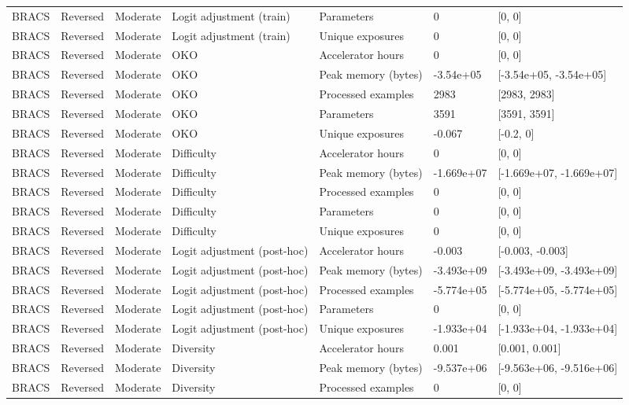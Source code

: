 \begin{longtable}{lllllll}
BRACS & Reversed & Moderate & Logit adjustment (train) & Parameters & 0 & [0, 0] \\
BRACS & Reversed & Moderate & Logit adjustment (train) & Unique exposures & 0 & [0, 0] \\
BRACS & Reversed & Moderate & OKO & Accelerator hours & 0 & [0, 0] \\
BRACS & Reversed & Moderate & OKO & Peak memory (bytes) & -3.54e+05 & [-3.54e+05, -3.54e+05] \\
BRACS & Reversed & Moderate & OKO & Processed examples & 2983 & [2983, 2983] \\
BRACS & Reversed & Moderate & OKO & Parameters & 3591 & [3591, 3591] \\
BRACS & Reversed & Moderate & OKO & Unique exposures & -0.067 & [-0.2, 0] \\
BRACS & Reversed & Moderate & Difficulty & Accelerator hours & 0 & [0, 0] \\
BRACS & Reversed & Moderate & Difficulty & Peak memory (bytes) & -1.669e+07 & [-1.669e+07, -1.669e+07] \\
BRACS & Reversed & Moderate & Difficulty & Processed examples & 0 & [0, 0] \\
BRACS & Reversed & Moderate & Difficulty & Parameters & 0 & [0, 0] \\
BRACS & Reversed & Moderate & Difficulty & Unique exposures & 0 & [0, 0] \\
BRACS & Reversed & Moderate & Logit adjustment (post-hoc) & Accelerator hours & -0.003 & [-0.003, -0.003] \\
BRACS & Reversed & Moderate & Logit adjustment (post-hoc) & Peak memory (bytes) & -3.493e+09 & [-3.493e+09, -3.493e+09] \\
BRACS & Reversed & Moderate & Logit adjustment (post-hoc) & Processed examples & -5.774e+05 & [-5.774e+05, -5.774e+05] \\
BRACS & Reversed & Moderate & Logit adjustment (post-hoc) & Parameters & 0 & [0, 0] \\
BRACS & Reversed & Moderate & Logit adjustment (post-hoc) & Unique exposures & -1.933e+04 & [-1.933e+04, -1.933e+04] \\
BRACS & Reversed & Moderate & Diversity & Accelerator hours & 0.001 & [0.001, 0.001] \\
BRACS & Reversed & Moderate & Diversity & Peak memory (bytes) & -9.537e+06 & [-9.563e+06, -9.516e+06] \\
BRACS & Reversed & Moderate & Diversity & Processed examples & 0 & [0, 0] \\

\end{longtable}
